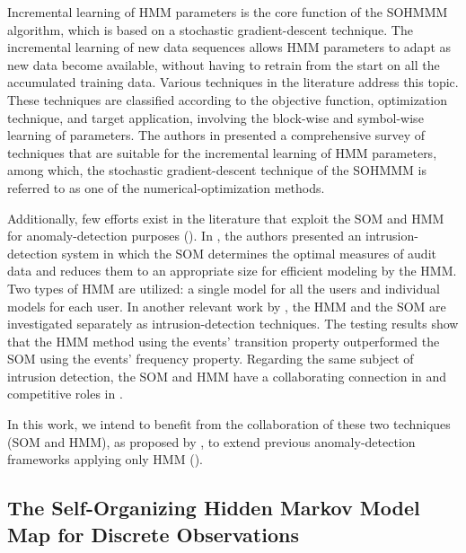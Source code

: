 Incremental learning of HMM parameters is the core function of the SOHMMM algorithm, which is based on a stochastic gradient-descent technique. The incremental learning of new data sequences allows HMM parameters to adapt as new data become available, without having to retrain from the start on all the accumulated training data. Various techniques in the literature address this topic. These techniques are classified according to the objective function, optimization technique, and target application, involving the block-wise and symbol-wise learning of parameters. The authors in \citet{Khreich2012} presented a comprehensive survey of techniques that are suitable for the incremental learning of HMM parameters, among which, the stochastic gradient-descent technique of the SOHMMM is referred to as one of the numerical-optimization methods.

Additionally, few efforts exist in the literature that exploit the SOM and HMM for anomaly-detection purposes (\citet{Cho2002,Wang2006}). In \citet{Cho2002}, the authors presented an intrusion-detection system in which the SOM determines the optimal measures of audit data and reduces them to an appropriate size for efficient modeling by the HMM. Two types of HMM are utilized: a single model for all the users and individual models for each user. In another relevant work by \citet{Wang2006}, the HMM and the SOM are investigated separately as intrusion-detection techniques. The testing results show that the HMM method using the events' transition property outperformed the SOM using the events' frequency property. Regarding the same subject of intrusion detection, the SOM and HMM have a collaborating connection in \citet{Cho2002} and competitive roles in \citet{Wang2006}.

In this work, we intend to benefit from the collaboration of these two techniques (SOM and HMM), as proposed by \citet{Ferles2008}, to extend previous anomaly-detection frameworks applying only HMM (\citet{Anisa2014,Anisa2017,Anisa2019}).

\subsection{The Self-Organizing Hidden Markov Model Map for Discrete Observations}
\label{sec:sohmmm_background}

